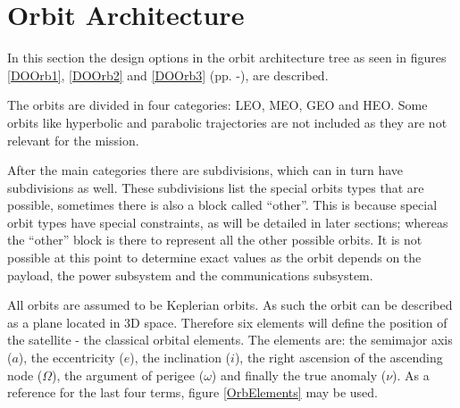 \section{Orbit Architecture}
\label{blDOOrb}
In this section the design options in the orbit architecture tree as seen in figures \ref{DOOrb1}, \ref{DOOrb2} and \ref{DOOrb3} (pp. \pageref{DOOrb1}-\pageref{DOOrb1}), are described. 

The orbits are divided in four categories: \ac{LEO}, \ac{MEO}, \ac{GEO} and \ac{HEO}. Some orbits like hyperbolic and parabolic trajectories are not included as they are not relevant for the mission.

After the main categories there are subdivisions, which can in turn have subdivisions as well. These subdivisions list the special orbits types that are possible, sometimes there is also a block called ``other''. This is because special orbit types have special constraints, as will be detailed in later sections; whereas the ``other'' block is there to represent all the other possible orbits. It is not possible at this point to determine exact values as the orbit depends on the payload, the power subsystem and the communications subsystem.

All orbits are assumed to be Keplerian orbits. As such the orbit can be described as a plane located in 3D space. Therefore six elements will define the position of the satellite - the classical orbital elements. The elements are: the semimajor axis ($a$), the eccentricity ($e$), the inclination ($i$), the right ascension of the ascending node ($\Omega$), the argument of perigee ($\omega$) and finally the true anomaly ($\nu$). As a reference for the last four terms, figure \ref{OrbElements} may be used.

